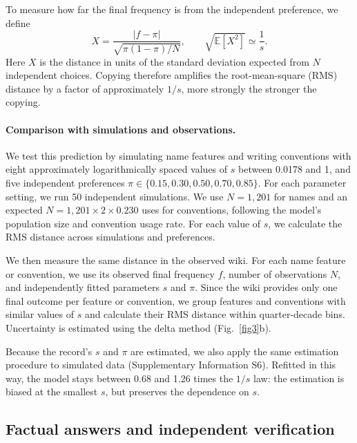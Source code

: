 \documentclass[11pt]{article}
\begin{document}
To measure how far the final frequency is from the independent preference, we define
\begin{equation}
X=\frac{|f-\pi|}{\sqrt{\pi(1-\pi)/N}},
\qquad
\sqrt{\mathbb E[X^2]}\simeq\frac{1}{s}.
\label{eq:distance}
\end{equation}
Here $X$ is the distance in units of the standard deviation expected from $N$ independent choices. Copying therefore amplifies the root-mean-square (RMS) distance by a factor of approximately $1/s$, more strongly the stronger the copying.

\paragraph{Comparison with simulations and observations.}

We test this prediction by simulating name features and writing conventions with eight approximately logarithmically spaced values of $s$ between 0.0178 and 1, and five independent preferences $\pi\in\{0.15,0.30,0.50,0.70,0.85\}$. For each parameter setting, we run 50 independent simulations. We use $N=1,201$ for names and an expected $N=1,201\times2\times0.230$ uses for conventions, following the model's population size and convention usage rate. For each value of $s$, we calculate the RMS distance across simulations and preferences.

We then measure the same distance in the observed wiki. For each name feature or convention, we use its observed final frequency $f$, number of observations $N$, and independently fitted parameters $s$ and $\pi$. Since the wiki provides only one final outcome per feature or convention, we group features and conventions with similar values of $s$ and calculate their RMS distance within quarter-decade bins. Uncertainty is estimated using the delta method (Fig.~\ref{fig3}b).

Because the record's $s$ and $\pi$ are estimated, we also apply the same estimation procedure to simulated data (Supplementary Information S6). Refitted in this way, the model stays between 0.68 and 1.26 times the $1/s$ law: the estimation is biased at the smallest $s$, but preserves the dependence on $s$. 

\subsection*{Factual answers and independent verification}
\end{document}
